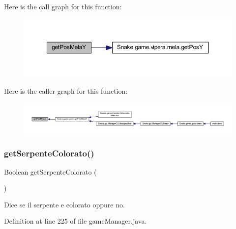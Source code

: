 Here is the call graph for this function\+:
\nopagebreak
\begin{figure}[H]
\begin{center}
\leavevmode
\includegraphics[width=350pt]{class_snake_1_1game_1_1utility_1_1game_manager_ac23b89dc8711992dc3124c04888a1365_cgraph}
\end{center}
\end{figure}
Here is the caller graph for this function\+:
\nopagebreak
\begin{figure}[H]
\begin{center}
\leavevmode
\includegraphics[width=350pt]{class_snake_1_1game_1_1utility_1_1game_manager_ac23b89dc8711992dc3124c04888a1365_icgraph}
\end{center}
\end{figure}
\mbox{\label{class_snake_1_1game_1_1utility_1_1game_manager_adf69d52c2b16c0b681a384f734f9dd0f}} 
\subsubsection{\texorpdfstring{get\+Serpente\+Colorato()}{getSerpenteColorato()}}
{\footnotesize\ttfamily Boolean get\+Serpente\+Colorato (\begin{DoxyParamCaption}{ }\end{DoxyParamCaption})}



Dice se il serpente e\textquotesingle{} colorato oppure no. 



Definition at line 225 of file game\+Manager.\+java.

